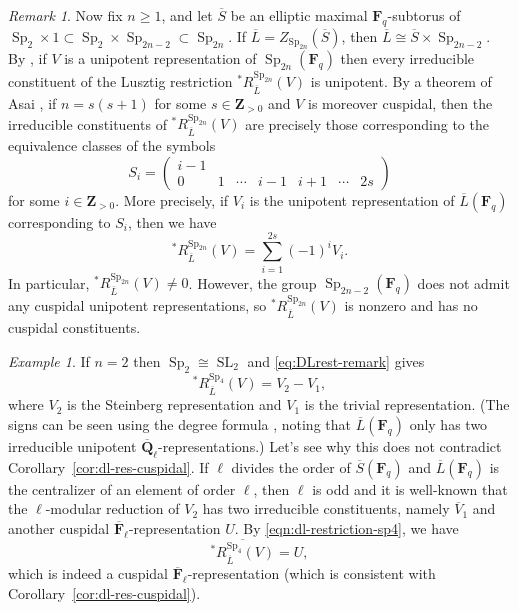\documentclass[reqno]{amsart}
\numberwithin{equation}{subsection}
\newcommand{\F}{\mathbf{F}}
\newcommand{\Q}{\mathbf{Q}}
\newcommand{\Z}{\mathbf{Z}}
\newcommand{\ol}[1]{\overline{#1}}
\DeclareMathOperator{\SL}{SL}
\DeclareMathOperator{\Sp}{Sp}
\theoremstyle{remark}
\newtheorem{remark}[thm]{Remark}
\newtheorem{example}[thm]{Example}
\numberwithin{equation}{subsection}
\numberwithin{figure}{subsection}
\begin{document}
\begin{remark}
    Now fix $n \geq 1$, and let $\ol S$ be an elliptic maximal $\F_q$-subtorus of $\Sp_2 \times 1 \subset \Sp_2 \times \Sp_{2n-2} \subset \Sp_{2n}$. If $\ol L = Z_{\Sp_{2n}}(\ol S)$, then $\ol L \cong \ol S \times \Sp_{2n-2}$. By \cite[Corollaire~11.11]{Bon06}, if $V$ is a unipotent representation of $\Sp_{2n}(\F_q)$ then every irreducible constituent of the Lusztig restriction $^*R^{\Sp_{2n}}_{\ol L}(V)$ is unipotent. By a theorem of Asai \cite[Theorem~4.6.9]{GM20}, if $n = s(s+1)$ for some $s \in \Z_{>0}$ and $V$ is moreover cuspidal, then the irreducible constituents of $^*R^{\Sp_{2n}}_{\ol L}(V)$ are precisely those corresponding to the equivalence classes of the symbols
    \[
    S_i = \begin{pmatrix}
        i-1 \\ 0&1&\cdots&i-1&i+1&\cdots&2s
    \end{pmatrix}
    \]
    for some $i \in \Z_{>0}$. More precisely, if $V_i$ is the unipotent representation of $\ol L(\F_q)$ corresponding to $S_i$, then we have
    \begin{equation}\label{eq:DLrest-remark}
    ^*R^{\Sp_{2n}}_{\ol L}(V) = \sum_{i=1}^{2s} (-1)^i V_i.
    \end{equation}
    In particular, $^*R^{\Sp_{2n}}_{\ol L}(V) \neq 0$. However, the group $\Sp_{2n-2}(\F_q)$ does not admit any cuspidal unipotent representations, so $^*R^{\Sp_{2n}}_{\ol L}(V)$ is nonzero and has no cuspidal constituents.
\end{remark}    

\begin{example}
    If $n = 2$ then $\Sp_2 \cong \SL_2$ and \eqref{eq:DLrest-remark} gives 
    \begin{equation}\label{eqn:dl-restriction-sp4}
    ^*R^{\Sp_4}_{\ol L}(V) = V_2 - V_1,
    \end{equation}
    where $V_2$ is the Steinberg representation and $V_1$ is the trivial representation. (The signs can be seen using the degree formula \cite[Proposition~4.4.15]{GM20}, noting that $\ol L(\F_q)$ only has two irreducible unipotent $\ol\Q_\ell$-representations.) Let's see why this does not contradict Corollary~\ref{cor:dl-res-cuspidal}. If $\ell$ divides the order of $\ol S(\F_q)$ and $\ol L(\F_q)$ is the centralizer of an element of order $\ell$, then $\ell$ is odd and it is well-known that the $\ell$-modular reduction of $V_2$ has two irreducible constituents, namely $\ol V_1$ and another cuspidal $\ol\F_\ell$-representation $U$. By \eqref{eqn:dl-restriction-sp4}, we have
    \[
    \ol{{}^*R^{\Sp_4}_{\ol L}(V)} = U,
    \]
    which is indeed a cuspidal $\ol\F_\ell$-representation (which is consistent with Corollary~\ref{cor:dl-res-cuspidal}).
\end{example}
\end{document}
